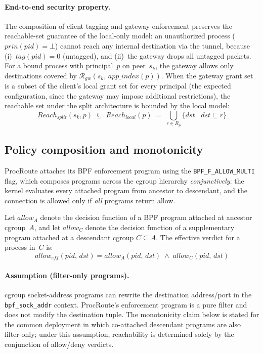 \documentclass[sigconf]{acmart}
\begin{document}
\paragraph{End-to-end security property.}
The composition of client tagging and gateway enforcement preserves
the reachable-set guarantee of the local-only model:
an unauthorized process ($\mathit{prin}(\mathit{pid}) = \bot$)
cannot reach any internal destination via the tunnel, because
(i)~$\mathit{tag}(\mathit{pid}) = 0$ (untagged), and
(ii)~the gateway drops all untagged packets.
For a bound process with principal~$p$ on peer~$s_k$, the gateway
allows only destinations covered by
$\mathcal{R}_{\mathit{gw}}(s_k,\, \mathit{app\_index}(p))$.
When the gateway grant set is a subset of the client's local
grant set for every principal (the expected configuration, since
the gateway may impose additional restrictions), the reachable set
under the split architecture is bounded by the local model:
\[
  \mathit{Reach}_{\mathit{split}}(s_k, p)
  \;\subseteq\;
  \mathit{Reach}_{\mathit{local}}(p)
  \;=\;
  \bigcup_{r \in R_p} \{ \mathit{dst} \mid \mathit{dst} \sqsubseteq r \}
\]

\subsection{Policy composition and monotonicity}
\label{sec:composition}

ProcRoute attaches its BPF enforcement program using the
\texttt{BPF\_F\_\allowbreak ALLOW\_MULTI} flag, which composes
programs across the cgroup hierarchy \emph{conjunctively}: the
kernel evaluates every attached program from ancestor to descendant,
and the connection is allowed only if \emph{all} programs return
allow.

Let $\mathit{allow}_A$ denote the decision function of a BPF
program attached at ancestor cgroup~$A$, and let
$\mathit{allow}_C$ denote the decision function of a supplementary
program attached at a descendant cgroup $C \subseteq A$.
The effective verdict for a process in~$C$ is:
\[
  \mathit{allow}_{\mathit{eff}}(\mathit{pid},\, \mathit{dst})
  = \mathit{allow}_A(\mathit{pid},\, \mathit{dst})
    \;\land\;
    \mathit{allow}_C(\mathit{pid},\, \mathit{dst})
\]

\paragraph{Assumption (filter-only programs).}
cgroup socket-address programs can rewrite the
destination address/port in the \texttt{bpf\_sock\_addr} context.
ProcRoute's enforcement program is a pure filter and does not modify
the destination tuple.
The monotonicity claim below is stated for the common deployment in
which co-attached descendant programs are also filter-only;
under this assumption, reachability
is determined solely by the conjunction of allow/deny verdicts.
\end{document}
